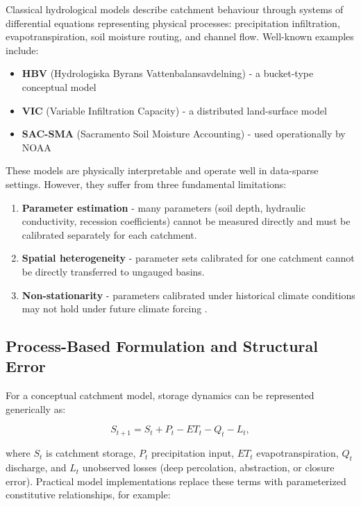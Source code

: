 \documentclass[
]{krantz}
\providecommand{\tightlist}{%
  \setlength{\itemsep}{0pt}\setlength{\parskip}{0pt}}
\begin{document}
Classical hydrological models describe catchment behaviour through systems of differential
equations representing physical processes: precipitation infiltration, evapotranspiration,
soil moisture routing, and channel flow. Well-known examples include:

\begin{itemize}
\tightlist
\item
  \textbf{HBV} (Hydrologiska Byrans Vattenbalansavdelning) - a bucket-type conceptual model
\item
  \textbf{VIC} (Variable Infiltration Capacity) - a distributed land-surface model
\item
  \textbf{SAC-SMA} (Sacramento Soil Moisture Accounting) - used operationally by NOAA
\end{itemize}

These models are physically interpretable and operate well in data-sparse settings.
However, they suffer from three fundamental limitations:

\begin{enumerate}
\def\labelenumi{\arabic{enumi}.}
\tightlist
\item
  \textbf{Parameter estimation} - many parameters (soil depth, hydraulic conductivity,
  recession coefficients) cannot be measured directly and must be calibrated
  separately for each catchment.
\item
  \textbf{Spatial heterogeneity} - parameter sets calibrated for one catchment cannot be
  directly transferred to ungauged basins.
\item
  \textbf{Non-stationarity} - parameters calibrated under historical climate conditions may
  not hold under future climate forcing \citep{milly2008}.
\end{enumerate}

\subsection{Process-Based Formulation and Structural Error}\label{process-based-formulation-and-structural-error}

For a conceptual catchment model, storage dynamics can be represented generically as:

\[
S_{t+1} = S_t + P_t - ET_t - Q_t - L_t,
\]

where \(S_t\) is catchment storage, \(P_t\) precipitation input, \(ET_t\) evapotranspiration,
\(Q_t\) discharge, and \(L_t\) unobserved losses (deep percolation, abstraction, or closure
error). Practical model implementations replace these terms with parameterized
constitutive relationships, for example:
\end{document}
